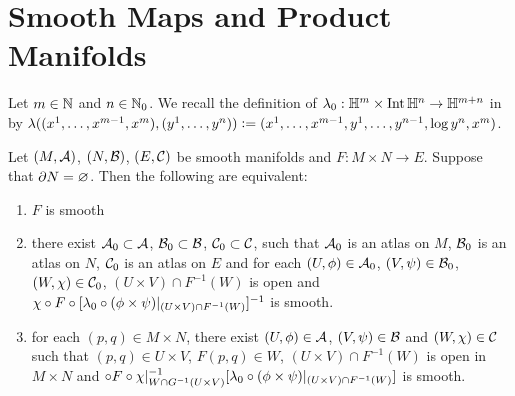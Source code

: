 \documentclass{book}
\begin{document}
\newpage 
\section{Smooth Maps and Product Manifolds}

\begin{note} 
	Let $m \in \mathbb{N}$ and $n \in \mathbb{N}_0$. We recall the definition of $\lambda_0: \mathbb{H}^m \times \operatorname{Int} \mathbb{H}^n \rightarrow \mathbb{H}^{m+n}$ in  by $\lambda((x^1, \ldots, x^{m-1}, x^m), (y^1, \ldots, y^n)) \vcentcolon= (x^1, \ldots, x^{m-1}, y^1, \ldots, y^{n-1}, \log y^n, x^m)$.  
\end{note}

\begin{ex} 
	Let $(M,\mathcal{A})$, $(N, \mathcal{B})$, $(E, \mathcal{C})$ be smooth manifolds and $F: M \times N \rightarrow E$. Suppose that $\partial N = \varnothing$. Then the following are equivalent:
	\begin{enumerate}
		\item $F$ is smooth 
		\item there exist $\mathcal{A}_0 \subset \mathcal{A}$, $\mathcal{B}_0 \subset \mathcal{B}$, $\mathcal{C}_0 \subset \mathcal{C}$, such that $\mathcal{A}_0$ is an atlas on $M$, $\mathcal{B}_0$ is an atlas on $N$, $\mathcal{C}_0$ is an atlas on $E$ and for each $(U, \phi) \in \mathcal{A}_0$, $(V, \psi) \in \mathcal{B}_0$, $(W, \chi) \in \mathcal{C}_0$, $(U \times V) \cap F^{-1}(W)$ is open and $\chi \circ F \circ [\lambda_0 \circ (\phi \times \psi)|_{(U \times V) \cap F^{-1}(W)}]^{-1}$ is smooth. 
		\item for each $(p,q) \in M \times N$, there exist $(U, \phi) \in \mathcal{A}$, $(V, \psi) \in \mathcal{B}$ and $(W, \chi) \in \mathcal{C}$ such that $(p,q) \in U \times V$, $F(p, q) \in W$, $(U \times V) \cap F^{-1}(W)$ is open in $M \times N$ and $\circ F \circ \chi|_{W \cap G^{-1}(U \times V)}^{-1} [\lambda_0 \circ (\phi \times \psi)|_{(U \times V) \cap F^{-1}(W)}]$ is smooth. 
	\end{enumerate}
\end{ex}
\end{document}
